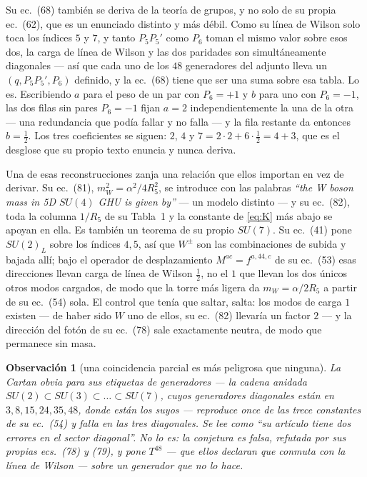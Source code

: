 \documentclass[11pt,a4paper]{article}
\newtheorem{observation}{Observación}
\newcommand{\su}[1]{SU(#1)}
\begin{document}
Su ec.~(68) también se deriva de la teoría de grupos, y no solo de su propia ec.~(62), que es un
enunciado distinto y más débil. Como su línea de Wilson solo toca los índices $5$ y $7$, y tanto
$P_5P_5'$ como $P_6$ toman el mismo valor sobre esos dos, la carga de línea de Wilson y las dos
paridades son simultáneamente diagonales --- así que cada uno de los $48$ generadores del adjunto
lleva un $(q,P_5P_5',P_6)$ definido, y la ec.~(68) tiene que ser una suma sobre esa tabla. Lo es.
Escribiendo $a$ para el peso de un par con $P_6=+1$ y $b$ para uno con $P_6=-1$, las dos filas sin
pares $P_6=-1$ fijan $a=2$ independientemente la una de la otra --- una redundancia que podía fallar
y no falla --- y la fila restante da entonces $b=\tfrac12$. Los tres coeficientes se siguen: $2$, $4$
y $7=2\cdot2+6\cdot\tfrac12=4+3$, que es el desglose que su propio texto enuncia y nunca deriva.

Una de esas reconstrucciones zanja una relación que ellos importan en vez de derivar. Su ec.~(81),
$m_W^2=\alpha^2/4R_5^2$, se introduce con las palabras \emph{``the W boson mass in 5D $\su4$ GHU is
given by''} --- un modelo distinto --- y su ec.~(82), toda la columna $1/R_5$ de su Tabla~1 y la
constante de \eqref{eq:K} más abajo se apoyan en ella. Es también un teorema de su propio $\su7$. Su
ec.~(41) pone $\su2_L$ sobre los índices $4,5$, así que $W^\pm$ son las combinaciones de subida y
bajada allí; bajo el operador de desplazamiento $M^{ac}=f^{a,44,c}$ de su ec.~(53) esas direcciones
llevan carga de línea de Wilson $\tfrac12$, no el $1$ que llevan los dos únicos otros modos cargados,
de modo que la torre más ligera da $m_W=\alpha/2R_5$ a partir de su ec.~(54) sola. El control que
tenía que saltar, salta: los modos de carga $1$ existen --- de haber sido $W$ uno de ellos, su
ec.~(82) llevaría un factor $2$ --- y la dirección del fotón de su ec.~(78) sale exactamente neutra,
de modo que permanece sin masa.

\begin{observation}[una coincidencia parcial es más peligrosa que ninguna]
La Cartan obvia para sus etiquetas de generadores --- la cadena anidada
$\su2\subset\su3\subset\dots\subset\su7$, cuyos generadores diagonales están en $3,8,15,24,35,48$,
donde están los suyos --- reproduce \emph{once de las trece} constantes de su ec.~(54) y falla en las
tres diagonales. Se lee como ``su artículo tiene dos errores en el sector diagonal''. No lo es: la
conjetura es falsa, refutada por sus propias ecs.~(78) y (79), y pone $T^{48}$ --- que ellos declaran
que conmuta con la línea de Wilson --- sobre un generador que no lo hace.
\end{observation}
\end{document}
